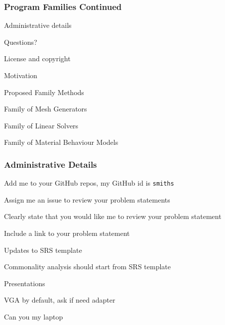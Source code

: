 \documentclass[t,12pt,numbers,fleqn]{beamer}
\newcounter{temp}
\begin{document}



\begin{frame}
\frametitle{Program Families Continued}

\bi
\item Administrative details
\item Questions?
\item License and copyright
\item Motivation
\item Proposed Family Methods
\item Family of Mesh Generators
\item Family of Linear Solvers
\item Family of Material Behaviour Models
\ei
\end{frame}


\begin{frame}
\frametitle{Administrative Details}

\bi
\item Add me to your GitHub repos, my GitHub id is \texttt{smiths}
\item Assign me an issue to review your problem statements
\bi
\item Clearly state that you would like me to review your problem statement
\item Include a link to your problem statement
\ei
\item Updates to SRS template
\item Commonality analysis should start from SRS template
\item Presentations
\bi
\item VGA by default, ask if need adapter
\item Can you my laptop
\ei
\ei

\end{frame}

\end{document}
